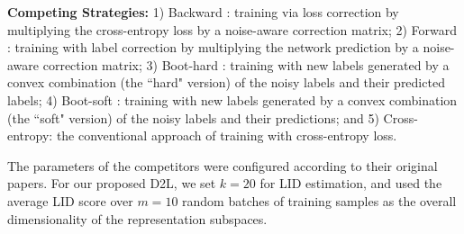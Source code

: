 \documentclass{article}
\begin{document}
\textbf{Competing Strategies:}
1) Backward \cite{patrini2017making}: training via loss correction by multiplying the cross-entropy loss by a noise-aware correction matrix; 2) Forward \cite{patrini2017making}: training with label correction by multiplying the network prediction by a noise-aware correction matrix; 3) Boot-hard \cite{reed2014training}: training with new labels generated by a convex combination (the ``hard" version) of the noisy labels and their predicted labels; 4) Boot-soft \cite{reed2014training}: training with new labels generated by a convex combination (the ``soft" version) of the noisy labels and their predictions; and 5) Cross-entropy: the conventional approach of training with cross-entropy loss.


The parameters of the competitors were configured according to their original papers. For our proposed D2L, we set $k=20$ for LID estimation, and used the average LID score over $m=10$ random batches of training samples as the overall dimensionality of the representation subspaces.

\end{document}
